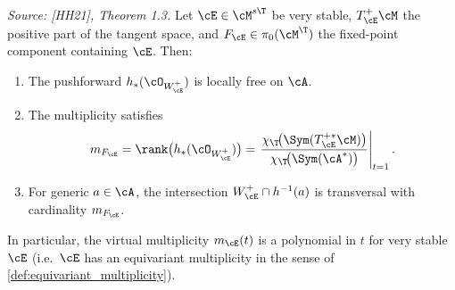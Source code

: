 \begin{theorem}
  \label{thm:multiplicity_formula}
  \textit{Source: [HH21], Theorem 1.3.}
  Let \(\cE \in \cM^{s\T}\) be very stable, \(T^+_{\cE}\cM\) the positive part of the tangent
  space, and \(F_{\cE} \in \pi_0(\cM^{\T})\) the fixed-point component containing \(\cE\).
  Then:
  \begin{enumerate}
    \item The pushforward \(h_*(\cO_{W^+_{\cE}})\) is locally free on \(\cA\).
    \item The multiplicity satisfies
          \[
            m_{F_{\cE}}
            = \rank\bigl(h_*(\cO_{W^+_{\cE}})\bigr)
            = \left.\frac{\chi_{\T}\!\bigl(\Sym(T^{+*}_{\cE}\cM)\bigr)}
                         {\chi_{\T}\!\bigl(\Sym(\cA^*)\bigr)}\right|_{t=1}.
          \]
    \item For generic \(a \in \cA\), the intersection \(W^+_{\cE} \cap h^{-1}(a)\) is
          transversal with cardinality \(m_{F_{\cE}}\).
  \end{enumerate}
  In particular, the virtual multiplicity \(m_{\cE}(t)\) is a polynomial in \(t\) for very stable
  \(\cE\) (i.e.\ \(\cE\) has an equivariant multiplicity in the sense of
  \cref{def:equivariant_multiplicity}).
\end{theorem}

